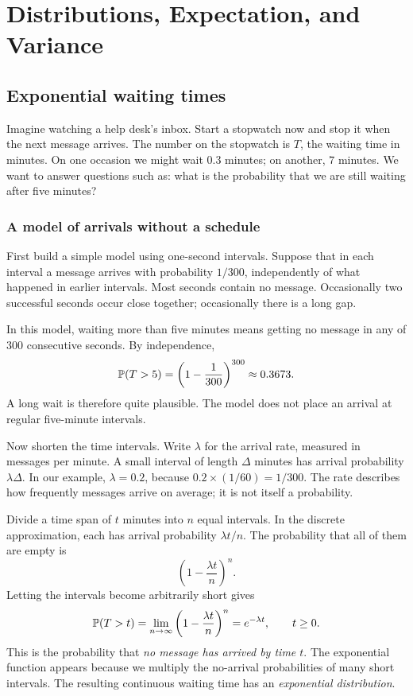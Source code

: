 \chapter{Distributions, Expectation, and Variance}
\label{chap:distributions}

\section{Exponential waiting times}
\label{sec:exponential}

Imagine watching a help desk's inbox. Start a stopwatch now and stop it
when the next message arrives. The number on the stopwatch is \(T\), the
waiting time in minutes. On one occasion we might wait \(0.3\) minutes;
on another, \(7\) minutes. We want to answer questions such as: what is
the probability that we are still waiting after five minutes?

\subsection{A model of arrivals without a schedule}

First build a simple model using one-second intervals. Suppose that in
each interval a message arrives with probability \(1/300\), independently
of what happened in earlier intervals. Most seconds contain no message.
Occasionally two successful seconds occur close together; occasionally
there is a long gap.

In this model, waiting more than five minutes means getting no message in
any of \(300\) consecutive seconds. By independence,
\[
  \mathbb{P}(T>5)=\left(1-\frac1{300}\right)^{300}\approx0.3673.
\]
A long wait is therefore quite plausible. The model does not place an
arrival at regular five-minute intervals.

Now shorten the time intervals. Write \(\lambda\) for the arrival rate,
measured in messages per minute. A small interval of length \(\Delta\)
minutes has arrival probability \(\lambda\Delta\).
In our example, \(\lambda=0.2\), because
\(0.2\times(1/60)=1/300\).
The rate describes how frequently messages arrive on average; it is not
itself a probability.

Divide a time span of \(t\) minutes into \(n\) equal intervals. In the
discrete approximation, each has arrival probability \(\lambda t/n\).
The probability that all of them are empty is
\[
  \left(1-\frac{\lambda t}{n}\right)^n.
\]
Letting the intervals become arbitrarily short gives
\begin{equation}
  \mathbb{P}(T>t)
  =\lim_{n\to\infty}\left(1-\frac{\lambda t}{n}\right)^n
  =e^{-\lambda t},\qquad t\ge0.
  \label{eq:exponential-tail}
\end{equation}
This is the probability that \emph{no message has arrived by time \(t\)}.
The exponential function appears because we multiply the no-arrival
probabilities of many short intervals. The resulting continuous waiting
time has an \emph{exponential distribution}.


